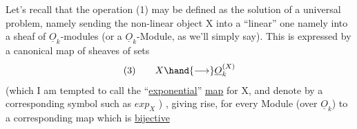 Let's recall that the operation (1) may be defined as the solution
of a universal problem,  namely sending the non-linear object X into
a ``linear'' one namely into a sheaf of $\underline{O}_k$-modules (or a $\underline{O}_k$-Module,  as
we'll simply say).  This is expressed by a canonical  map of sheaves
of sets
\[ (3) \qquad X \hand{\longrightarrow} \underline{O}_k^{(X)} \]
(which I am tempted to call the ``\uline{exponential}'' \uline{map} for X, and denote by
a corresponding symbol such as $exp_X$ ) ,  giving rise,  for every Module
(over $\underline{O}_k$)  to a corresponding map which is \uline{bijective}


